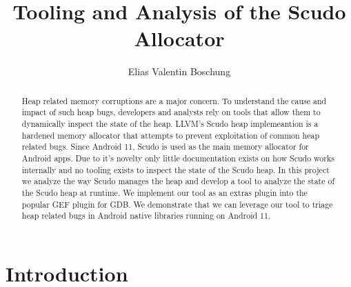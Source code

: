 \documentclass[a4paper,11pt,oneside]{report}
\title{Tooling and Analysis of the Scudo Allocator}
\author{Elias Valentin Boschung}
\begin{document}
\maketitle{}
\dedication{Dedicated to my study companion since Covid-19, my plush bear.}
\makededication{}
\makeacks{}

\begin{abstract}
Heap related memory corruptions are a major concern.
To understand the cause and impact of such heap bugs,
developers and analysts rely on tools that allow them to
dynamically inspect the state of the heap.
LLVM's Scudo heap implemeantion is a hardened memory allocator that 
attempts to prevent exploitation of common heap related bugs.
Since Android 11, Scudo is used as the main memory allocator for Android apps.
Due to it's novelty only little documentation exists on how Scudo 
works internally and no tooling exists to inspect the state of the Scudo heap.
In this project we analyze the way Scudo manages the heap and
develop a tool to analyze the state of the Scudo heap at runtime.
We implement our tool as an extras plugin into the popular GEF plugin for GDB.
We demonstrate that we can leverage our tool to triage heap related bugs in 
Android native libraries running on Android 11.

\end{abstract}

\maketoc{}

\chapter{Introduction}
\end{document}
